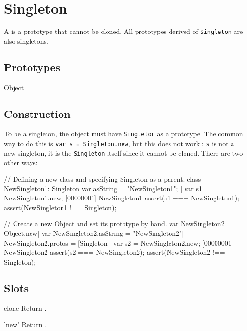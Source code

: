 
\section{Singleton}

A  is a prototype that cannot be cloned. All prototypes
derived of \lstinline{Singleton} are also singletons.

\subsection{Prototypes}
\begin{refObjects}
\item[Object]
\end{refObjects}

\subsection{Construction}

To be a singleton, the object must have \lstinline{Singleton} as a
prototype. The common way to do this is
%
\lstinline{var s = Singleton.new},
%
but this does not work : \lstinline|s| is not a new singleton, it is
the \lstinline|Singleton| itself since it cannot be cloned. There are
two other ways:

\begin{urbiscript}[firstnumber=1]
// Defining a new class and specifying Singleton as a parent.
class NewSingleton1: Singleton
{
  var asString = "NewSingleton1";
}|
var s1 = NewSingleton1.new;
[00000001] NewSingleton1
assert(s1 === NewSingleton1);
assert(NewSingleton1 !== Singleton);

// Create a new Object and set its prototype by hand.
var NewSingleton2 = Object.new|
var NewSingleton2.asString = "NewSingleton2"|
NewSingleton2.protos = [Singleton]|
var s2 = NewSingleton2.new;
[00000001] NewSingleton2
assert(s2 === NewSingleton2);
assert(NewSingleton2 !== Singleton);
\end{urbiscript}

\subsection{Slots}
\begin{urbiscriptapi}
\item[clone]
  Return \this.

\item['new']%
  Return \this.
\end{urbiscriptapi}

